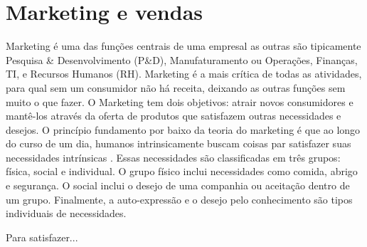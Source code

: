 \chapter{Marketing e vendas}

Marketing é uma das funções centrais de uma empresal as outras são tipicamente
Pesquisa & Desenvolvimento (P&D), Manufaturamento ou Operações, Finanças, TI,
e Recursos Humanos (RH).  Marketing é a mais crítica de todas as atividades,
para qual sem um consumidor não há receita, deixando as outras funções sem
muito o que fazer.   O Marketing tem dois 
objetivos: atrair novos consumidores e mantê-los através da oferta de
produtos que satisfazem outras necessidades e desejos.  O princípio fundamento
por baixo da teoria do marketing é que ao longo do curso de um dia, humanos 
intrinsicamente buscam coisas par satisfazer suas necessidades intrínsicas
\cite{moore2010marketing}. %
Essas necessidades são classificadas em três grupos: física, social
e individual.  O grupo físico inclui necessidades como comida, abrigo e
segurança.  O social inclui o desejo de uma companhia ou aceitação dentro
de um grupo.  Finalmente, a auto-expressão e o desejo pelo conhecimento são 
tipos individuais de necessidades.


Para satisfazer...


